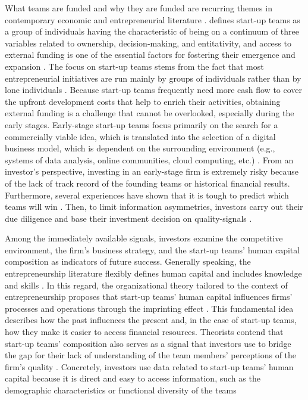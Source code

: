 \documentclass[12pt]{article}
\begin{document}
What teams are funded and why they are funded are recurring themes in contemporary economic and entrepreneurial literature \citep{klein2020start}. \citet{knight2020start} defines start-up teams as a group of individuals having the characteristic of being on a continuum of three variables related to ownership, decision-making, and entitativity, and access to external funding is one of the essential factors for fostering their emergence and expansion \citep{klein2020start}. The focus on start-up teams stems from the fact that most entrepreneurial initiatives are run mainly by groups of individuals rather than by lone individuals \citep{klotz2014new}. Because start-up teams frequently need more cash flow to cover the upfront development costs that help to enrich their activities, obtaining external funding is a challenge that cannot be overlooked, especially during the early stages. Early-stage start-up teams focus primarily on the search for a commercially viable idea, which is translated into the selection of a digital business model, which is dependent on the surrounding environment (e.g., systems of data analysis, online communities, cloud computing, etc.) \citep{nambisan2017digital}. From an investor's perspective, investing in an early-stage firm is extremely risky because of the lack of track record of the founding teams or historical financial results. Furthermore, several experiences have shown that it is tough to predict which teams will win \citep{ghassemiautomated, duhigg2016google}. Then, to limit information asymmetries, investors carry out their due diligence and base their investment decision on quality-signals \citep{spence1978job, ko2018signaling}.

Among the immediately available signals, investors examine the competitive environment, the firm's business strategy, and the start-up teams' human capital composition as indicators of future success. Generally speaking, the entrepreneurship literature flexibly defines human capital and includes knowledge and skills \citep{ngoasong2017digital, marvel2016human}. In this regard, the organizational theory tailored to the context of entrepreneurship proposes that start-up teams' human capital influences firms' processes and operations through the imprinting effect \citep{packalen2007complementing}. This fundamental idea describes how the past influences the present and, in the case of start-up teams, how they make it easier to access financial resources. Theorists contend that start-up teams' composition also serves as a signal \citep{spence1974market} that investors use to bridge the gap for their lack of understanding of the team members' perceptions of the firm's quality \citep{plummer2016better}. Concretely, investors use data related to start-up teams' human capital because it is direct and easy to access information, such as the demographic characteristics or functional diversity of the teams \citep{colombo2005founders, beckman2007early, eddleston2016you}
\end{document}
